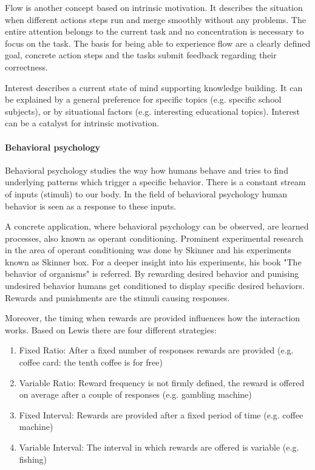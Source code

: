 \label{flow}
Flow is another concept based on intrinsic motivation. It describes the situation when different actions steps run and merge smoothly without any problems. The entire attention belongs to the current task and no concentration is necessary to focus on the task. The basis for being able to experience flow are a clearly defined goal, concrete action steps and the tasks submit feedback regarding their correctness. \cite[p. 19, 20, 21]{bierhoffeditorEnzyklopaediePsychologieSoziale2016}

Interest describes a current state of mind supporting knowledge building. It can be explained by a general preference for specific topics (e.g. specific school subjects), or by situational factors (e.g. interesting educational topics). Interest can be a catalyst for intrinsic motivation. \cite[p. 22, 23, 24]{bierhoffeditorEnzyklopaediePsychologieSoziale2016}

\paragraph*{Behavioral psychology}

Behavioral psychology studies the way how humans behave and tries to find underlying patterns which trigger a specific behavior. There is a constant stream of inputs (stimuli) to our body. In the field of  behavioral psychology human behavior is seen as a response to these inputs. \cite[p. 10]{lewisIrresistibleAppsMotivational2014}

A concrete application, where behavioral psychology can be observed, are learned processes, also known as operant conditioning. Prominent experimental research in the area of operant conditioning was done by Skinner and his experiments known as Skinner box. For a deeper insight into his experiments, his book "The behavior of organisms" \cite{skinnerBehaviorOrganisms1938} is referred. By rewarding desired behavior and punising undesired behavior humans get conditioned to display specific desired behaviors. Rewards and punishments are the stimuli causing responses. \cite[p. 11]{lewisIrresistibleAppsMotivational2014}

Moreover, the timing when rewards are provided influences how the interaction works.
Based on Lewis \cite[p. 10]{lewisIrresistibleAppsMotivational2014} there are four different strategies:
\begin{enumerate}
	\item Fixed Ratio: After a fixed number of responses rewards are provided (e.g. coffee card: the tenth coffee is for free)
	\item Variable Ratio: Reward frequency is not firmly defined, the reward is offered on average after a couple of responses (e.g. gambling machine)
	\item Fixed Interval: Rewards are provided after a fixed period of time (e.g. coffee machine)
	\item Variable Interval: The interval in which rewards are offered is variable (e.g. fishing)
\end{enumerate}

